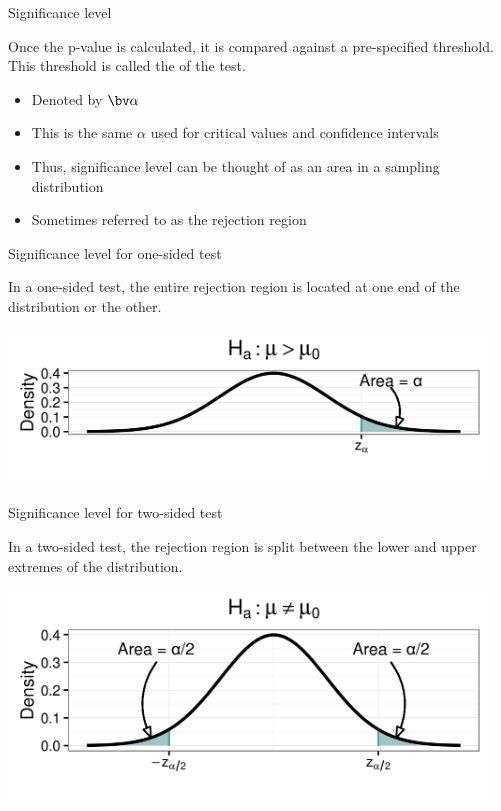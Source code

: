 \documentclass[xcolor=table, aspectratio=169, bigger, handout]{beamer}
\begin{document}
\begin{frame}{Significance level}
\begin{block}{}
Once the p-value is calculated, it is compared against a pre-specified threshold. This threshold is called the  of the test.
\begin{itemize}
\pause\item Denoted by $\bv \alpha$
\pause\item This is the same $\alpha$ used for critical values and confidence intervals
\pause\item Thus, significance level can be thought of as an area in a sampling distribution
\pause\item Sometimes referred to as the rejection region
\end{itemize}
\end{block}
\end{frame}

\begin{frame}{Significance level for one-sided test}
\begin{block}{}
In a one-sided test, the entire rejection region is located at one end of the distribution or the other.
\end{block}

\bigskip

{\centering
\includegraphics[width=5in]{../images/wk08_sig_up}
\par}
\end{frame}

\begin{frame}{Significance level for two-sided test}
\begin{block}{}
In a two-sided test, the rejection region is split between the lower and upper extremes of the distribution.
\end{block}
\bigskip
{\centering
\includegraphics[width=5in]{../images/wk08_sig_2}
\par}

\end{frame}
\end{document}
